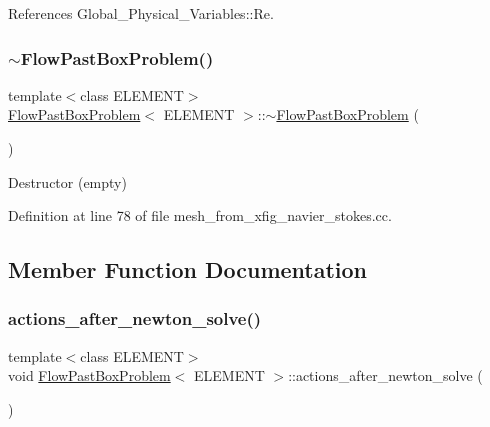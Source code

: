 References Global\+\_\+\+Physical\+\_\+\+Variables\+::\+Re.

\mbox{\label{classFlowPastBoxProblem_a48bb150799924e3d0ab42a610babefbd}} 
\subsubsection{\texorpdfstring{$\sim$\+Flow\+Past\+Box\+Problem()}{~FlowPastBoxProblem()}}
{\footnotesize\ttfamily template$<$class E\+L\+E\+M\+E\+NT$>$ \\
\hyperlink{classFlowPastBoxProblem}{Flow\+Past\+Box\+Problem}$<$ E\+L\+E\+M\+E\+NT $>$\+::$\sim$\hyperlink{classFlowPastBoxProblem}{Flow\+Past\+Box\+Problem} (\begin{DoxyParamCaption}{ }\end{DoxyParamCaption})\hspace{0.3cm}{\ttfamily [inline]}}



Destructor (empty) 



Definition at line 78 of file mesh\+\_\+from\+\_\+xfig\+\_\+navier\+\_\+stokes.\+cc.



\subsection{Member Function Documentation}
\mbox{\label{classFlowPastBoxProblem_a5d226368814cfbf84f274a63b3c0b20c}} 
\subsubsection{\texorpdfstring{actions\+\_\+after\+\_\+newton\+\_\+solve()}{actions\_after\_newton\_solve()}}
{\footnotesize\ttfamily template$<$class E\+L\+E\+M\+E\+NT$>$ \\
void \hyperlink{classFlowPastBoxProblem}{Flow\+Past\+Box\+Problem}$<$ E\+L\+E\+M\+E\+NT $>$\+::actions\+\_\+after\+\_\+newton\+\_\+solve (\begin{DoxyParamCaption}{ }\end{DoxyParamCaption})\hspace{0.3cm}{\ttfamily [inline]}}



